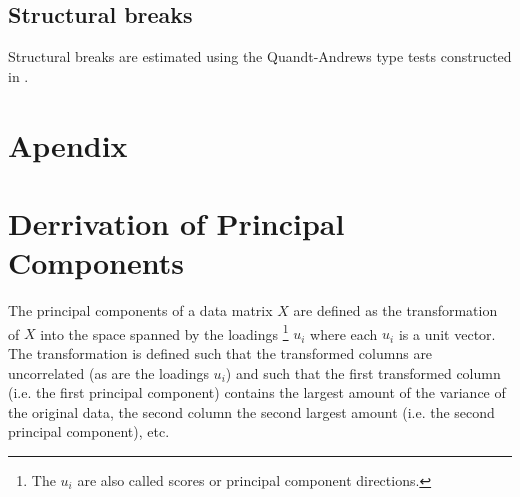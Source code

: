 \documentclass[11pt]{article}
\begin{document}
\subsection{Structural breaks}
Structural breaks are estimated using the Quandt-Andrews type tests constructed in \citet{breitung2011testing}. \\


\newpage
\appendix
\section*{Apendix}

\section{Derrivation of Principal Components}
\label{Derrivation of Principal Components}
The principal components of a data matrix $X$ are defined as the transformation of $X$ into the space spanned by the loadings \footnote{The $u_i$ are also called scores or principal component directions.} $u_i$ where each $u_i$ is a unit vector. The transformation is defined such that the transformed columns are uncorrelated (as are the loadings $u_i$) and such that the first transformed column (i.e. the first principal component) contains the largest amount of the variance of the original data, the second column the second largest amount (i.e. the second principal component), etc. \\
\end{document}
